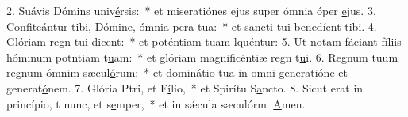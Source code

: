 2. Suávis Dómins univ\uline{é}rsis:~* et miseratiónes ejus super ómnia óper \uline{e}jus.
3. Confiteántur tibi, Dómine, ómnia pera t\uline{u}a:~* et sancti tui benedícnt t\uline{i}bi.
4. Glóriam regn tui d\uline{i}cent:~* et poténtiam tuam l\uline{qué}ntur:
5. Ut notam fáciant fíliis hóminum potntiam t\uline{u}am:~* et glóriam magnificéntiæ regn t\uline{u}i.
6. Regnum tuum regnum ómnim sæcul\uline{ó}rum:~* et dominátio tua in omni generatióne et generat\uline{ó}nem.
7. Glória Ptri, et F\uline{í}lio,~* et Spirítu S\uline{a}ncto.
8. Sicut erat in princípio, t nunc, et s\uline{e}mper,~* et in sǽcula sæculórm. \uline{A}men.

